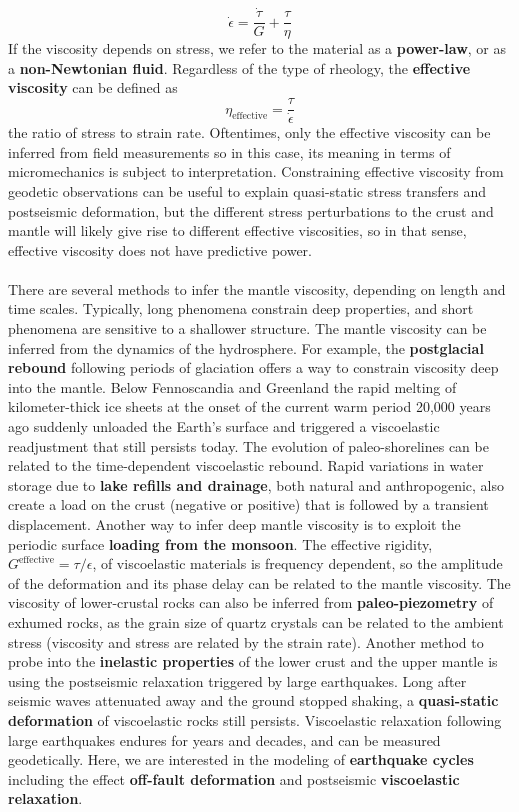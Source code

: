 \documentclass[letterpaper,12pt,]{memoir}
\begin{document}
\begin{equation}
\dot{\epsilon}=\frac{\dot{\tau}}{G}+\frac{\tau}{\eta}
\end{equation}
If the viscosity depends on stress, we refer to the material as a \textbf{power-law}, or as a \textbf{non-Newtonian fluid}. Regardless of the type of rheology, the \textbf{effective viscosity} can be defined as
\begin{equation}
\eta_\text{effective}=\frac{\tau}{\dot{\epsilon}}
\end{equation}
the ratio of stress to strain rate. Oftentimes, only the effective viscosity can be inferred from field measurements so in this case, its meaning in terms of micromechanics is subject to interpretation. Constraining effective viscosity from geodetic observations can be useful to explain quasi-static stress transfers and postseismic deformation, but the different stress perturbations to the crust and mantle will likely give rise to different effective viscosities, so in that sense, effective viscosity does not have predictive power. \\
\\
There are several methods to infer the mantle viscosity, depending on length and time scales. Typically, long phenomena constrain deep properties, and short phenomena are sensitive to a shallower structure. The mantle viscosity can be inferred from the dynamics of the hydrosphere. For example, the \textbf{postglacial rebound} following periods of glaciation offers a way to constrain viscosity deep into the mantle. Below Fennoscandia and Greenland the rapid melting of kilometer-thick ice sheets at the onset of the current warm period 20,000 years ago suddenly unloaded the Earth's surface and triggered a viscoelastic readjustment that still persists today. The evolution of paleo-shorelines can be related to the time-dependent viscoelastic rebound. Rapid variations in water storage due to \textbf{lake refills and drainage}, both natural and anthropogenic, also create a load on the crust (negative or positive) that is followed by a transient displacement.  Another way to infer deep mantle viscosity is to exploit the periodic surface \textbf{loading from the monsoon}. The effective rigidity, $G^\text{effective}=\tau/\epsilon$, of viscoelastic materials is frequency dependent, so the amplitude of the deformation and its phase delay can be related to the mantle viscosity. The viscosity of lower-crustal rocks can also be inferred from \textbf{paleo-piezometry} of exhumed rocks, as the grain size of quartz crystals can be related to the ambient stress (viscosity and stress are related by the strain rate). Another method to probe into the \textbf{inelastic properties} of the lower crust and the upper mantle is using the postseismic relaxation triggered by large earthquakes. Long after seismic waves attenuated away and the ground stopped shaking, a \textbf{quasi-static deformation} of viscoelastic rocks still persists. Viscoelastic relaxation following large earthquakes endures for years and decades, and can be measured geodetically. Here, we are interested in the modeling of \textbf{earthquake cycles} including the effect \textbf{off-fault deformation} and postseismic \textbf{viscoelastic relaxation}.
\end{document}
